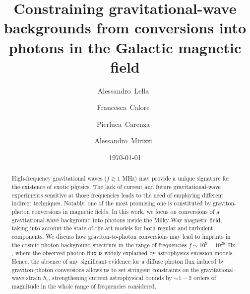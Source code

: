 \documentclass[twocolumn,superscriptaddress,floatfix,preprintnumbers, nofootinbib,hyperref]{revtex4-2}
\DeclareMathOperator{\Hz}{Hz}
\begin{document}

\title{Constraining gravitational-wave backgrounds from conversions into photons in the Galactic magnetic field}

\author{Alessandro~Lella~}
%

\author{Francesca~Calore~}

\author{Pierluca~Carenza~}

\author{Alessandro~Mirizzi~}
%

\date{\today}
\smallskip

\begin{abstract}

High-frequency gravitational waves ($f \gtrsim  1$ MHz) may provide a unique signature for the existence of exotic physics. The lack of current and future gravitational-wave experiments sensitive at those frequencies leads to the need of  employing different indirect techniques. Notably, one of the most promising one is constituted  by graviton-photon conversions in magnetic fields. In this work, we focus on conversions of a gravitational-wave background into photons inside the Milky-Way magnetic field, taking into account the state-of-the-art models for both regular and turbulent components. We discuss how graviton-to-photon conversions may lead to imprints in the cosmic photon background  spectrum in the range of frequencies $f\sim10^{9}-10^{26}\,\Hz$, where the observed photon flux is widely explained by astrophysics emission models.  Hence, the absence of any significant evidence for a diffuse photon flux induced by graviton-photon conversions allows us to set stringent constraints on the gravitational-wave strain $h_c$, strengthening current astrophysical bounds by $\sim1-2$ orders of magnitude in the whole range of frequencies considered.
 
\end{abstract}
\end{document}
